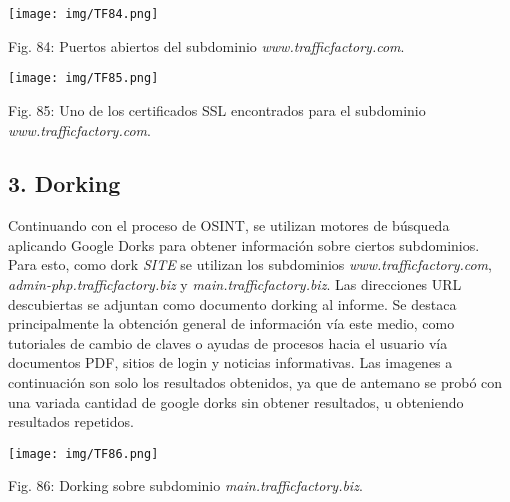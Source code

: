 \documentclass[12pt,oneside,a4paper]{book}
\newcommand{\newsection}[1]{{\subsection*{#1}
\addcontentsline{toc}{section}{#1}}}
\begin{document}
\begin{center}
	\texttt{[image: img/TF84.png]}
    
\vspace{0.1em}
    
    Fig. 84: Puertos abiertos del subdominio \textit{www.trafficfactory.com}.
\end{center}

\vspace{2em}

\begin{center}
	\texttt{[image: img/TF85.png]}
    
\vspace{0.1em}
    
    Fig. 85: Uno de los certificados SSL encontrados para el subdominio \textit{www.trafficfactory.com}.
\end{center}

\vspace{2em}

\newsection{3.	Dorking}

\vspace{1em}

\hspace{20pt}
Continuando con el proceso de OSINT, se utilizan motores de búsqueda aplicando Google Dorks para obtener información sobre ciertos subdominios. Para esto, como dork \textit{SITE} se utilizan los subdominios \textit{www.trafficfactory.com}, \textit{admin-php.trafficfactory.biz} y \newline \textit{main.trafficfactory.biz}. Las direcciones URL descubiertas se adjuntan como documento dorking al informe. Se destaca principalmente la obtención general de información vía este medio, como tutoriales de cambio de claves o ayudas de procesos hacia el usuario vía documentos PDF, sitios de login y noticias informativas. Las imagenes a continuación son solo los resultados obtenidos, ya que de antemano se probó con una variada cantidad de google dorks sin obtener resultados, u obteniendo resultados repetidos.

\newpage

\begin{center}
	\texttt{[image: img/TF86.png]}
    
\vspace{0.1em}
    
    Fig. 86: Dorking sobre subdominio \textit{main.trafficfactory.biz}.
\end{center}
\end{document}
